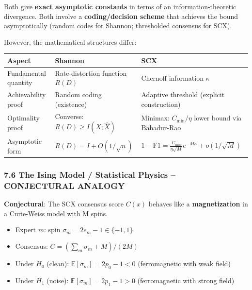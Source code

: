 \documentclass[
  12pt,
]{article}
\providecommand{\tightlist}{%
  \setlength{\itemsep}{0pt}\setlength{\parskip}{0pt}}
\begin{document}
Both give \textbf{exact asymptotic constants} in terms of an
information-theoretic divergence. Both involve a \textbf{coding/decision
scheme} that achieves the bound asymptotically (random codes for
Shannon; thresholded consensus for SCX).

However, the mathematical structures differ:

\begin{longtable}[]{@{}
  >{\raggedright\arraybackslash}p{}
  >{\raggedright\arraybackslash}p{}
  >{\raggedright\arraybackslash}p{}@{}}
\toprule\noalign{}
\begin{minipage}[b]{\linewidth}\raggedright
Aspect
\end{minipage} & \begin{minipage}[b]{\linewidth}\raggedright
Shannon
\end{minipage} & \begin{minipage}[b]{\linewidth}\raggedright
SCX
\end{minipage} \\
\midrule\noalign{}
\endhead
\bottomrule\noalign{}
\endlastfoot
Fundamental quantity & Rate-distortion function \(R(D)\) & Chernoff
information \(\kappa\) \\
Achievability proof & Random coding (existence) & Adaptive threshold
(explicit construction) \\
Optimality proof & Converse: \(R(D) \geq I(X;\hat{X})\) & Minimax:
\(C_{\min}/\eta\) lower bound via Bahadur-Rao \\
Asymptotic form & \(R(D) = I + O(1/\sqrt{n})\) &
\(1 - \text{F1} = \frac{C_{\min}}{\eta\sqrt{M}} e^{-M\kappa} + o(1/\sqrt{M})\) \\
\end{longtable}

\subsubsection{7.6 The Ising Model / Statistical Physics -- CONJECTURAL
ANALOGY}\label{the-ising-model-statistical-physics-conjectural-analogy}

\textbf{Conjectural}: The SCX consensus score \(C(x)\) behaves like a
\textbf{magnetization} in a Curie-Weiss model with M spins.

\begin{itemize}
\tightlist
\item
  Expert \(m\): spin \(\sigma_m = 2e_m - 1 \in \{-1, 1\}\)
\item
  Consensus: \(C = (\sum_m \sigma_m + M) / (2M)\)
\item
  Under \(H_0\) (clean): \(\mathbb{E}[\sigma_m] = 2p_0 - 1 < 0\)
  (ferromagnetic with weak field)
\item
  Under \(H_1\) (noise): \(\mathbb{E}[\sigma_m] = 2p_1 - 1 > 0\)
  (ferromagnetic with strong field)
\end{itemize}
\end{document}
